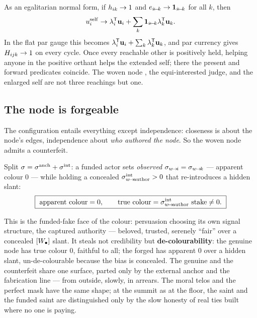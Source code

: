 \documentclass[../main]{subfiles}
\begin{document}
As an egalitarian normal form, if $h\sb{ ik }\to1$ and
$e\sb{ \ensuremath{i\!\leftarrow\!k} }\to\mathbf{1}\sb{ \ensuremath{i\!\leftarrow\!k} }$ for all $k$, then
\begin{equation}
  u\sb{i}\sp{\mathrm{self}}\to
  \lambda\sb{i}\sp{\mathsf{T}}\mathbf{u}\sb{i}+
  \sum_k\mathbf{1}\sb{ \ensuremath{i\!\leftarrow\!k} }\lambda\sb{k}\sp{\mathsf{T}}\mathbf{u}\sb{k}.
  \label{eq:conv:normalform}
\end{equation}
In the flat par gauge this becomes $\lambda\sb{i}\sp{\mathsf{T}}\mathbf{u}\sb{i}+\sum_k\lambda\sb{k}\sp{\mathsf{T}}\mathbf{u}\sb{k}$, and par
currency gives $H\sb{ \ensuremath{ijk} }\to1$ on every cycle. Once every reachable other is
positively held, helping anyone in the positive orthant helps the extended self; there the
present and forward predicates coincide. The woven node , the equi-interested
judge, and the enlarged self are not three reachings but one.

\subsection{The node is forgeable}
\label{subsec:conv:forge}
%
The configuration entails everything except independence: closeness is about the node's
edges, independence about \emph{who authored the node}. So the woven node admits a
counterfeit.

\begin{theorem}
  Split $\sigma=\sigma\sp{\mathrm{anch}}+\sigma\sp{\mathrm{int}}$: a funded actor sets \emph{observed}
  $\sigma\sb{ w\!\to\!i }=\sigma\sb{ w\!\to\!k }$ --- apparent colour $0$ --- while holding a concealed
  $\sigma\sp{\mathrm{int}}\sb{ w\!\to\!\mathrm{author} }>0$ that re-introduces a hidden slant:
  \begin{equation}
    \boxed{\ \text{apparent colour}=0,\qquad
      \text{true colour}=\alignintof{w}{\mathrm{author}}\,\stake\neq0.\ }
    \label{eq:conv:forge}
  \end{equation}
\end{theorem}

This is the funded-fake face of the colour: persuasion choosing its own signal structure, the
captured authority --- beloved, trusted, serenely ``fair'' over a concealed $[W\sb{\bullet}]$
slant. It steals not credibility but \textbf{de-colourability}: the genuine node has true
colour $0$, faithful to all; the forged has apparent $0$ over a hidden slant,
un-de-colourable because the bias is concealed. The genuine and the counterfeit share one
surface, parted only by the external anchor and the fabrication line  --- from
outside, slowly, in arrears. The moral telos and the perfect mask have the same shape; at the
summit as at the floor, the saint and the funded saint are distinguished only by the slow
honesty of real ties built where no one is paying.
\end{document}
